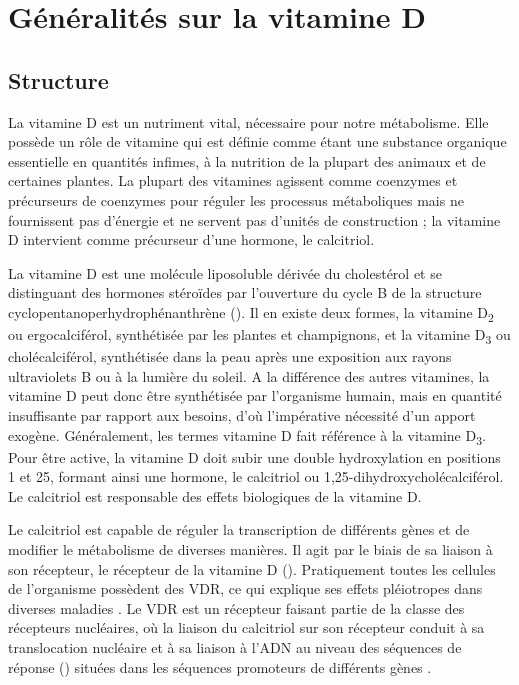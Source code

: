 \documentclass[
  a4paper,
  DIV=11,
  numbers=noendperiod,
  listof=totoc]{scrreprt}
\begin{document}
\newpage{}

\chapter{Généralités sur la vitamine
D}\label{guxe9nuxe9ralituxe9s-sur-la-vitamine-d}

\section{Structure}\label{structure}

La vitamine D est un nutriment vital, nécessaire pour notre métabolisme.
Elle possède un rôle de vitamine qui est définie comme étant une
substance organique essentielle en quantités infimes, à la nutrition de
la plupart des animaux et de certaines plantes. La plupart des vitamines
agissent comme coenzymes et précurseurs de coenzymes pour réguler les
processus métaboliques mais ne fournissent pas d'énergie et ne servent
pas d'unités de construction \autocite{Ellison.2021} ; la vitamine D
intervient comme précurseur d'une hormone, le calcitriol.

La vitamine D est une molécule liposoluble dérivée du cholestérol et se
distinguant des hormones stéroïdes par l'ouverture du cycle B de la
structure cyclopentanoperhydrophénanthrène \autocite{Norman.2008}
(). Il en existe deux formes, la vitamine
D\textsubscript{2} ou ergocalciférol, synthétisée par les plantes et
champignons, et la vitamine D\textsubscript{3} ou cholécalciférol,
synthétisée dans la peau après une exposition aux rayons ultraviolets B
ou à la lumière du soleil. A la différence des autres vitamines, la
vitamine D peut donc être synthétisée par l'organisme humain, mais en
quantité insuffisante par rapport aux besoins, d'où l'impérative
nécessité d'un apport exogène. Généralement, les termes vitamine D fait
référence à la vitamine D\textsubscript{3}. Pour être active, la
vitamine D doit subir une double hydroxylation en positions 1 et 25,
formant ainsi une hormone, le calcitriol ou
1,25-dihydroxycholécalciférol. Le calcitriol est responsable des effets
biologiques de la vitamine D.

Le calcitriol est capable de réguler la transcription de différents
gènes et de modifier le métabolisme de diverses manières. Il agit par le
biais de sa liaison à son récepteur, le récepteur de la vitamine D
(). Pratiquement toutes les cellules de l'organisme possèdent
des \ac{VDR}, ce qui explique ses effets pléiotropes dans diverses
maladies \autocite{Ellison.2021,Caprio.2017,Norman.2008}. Le \ac{VDR}
est un récepteur faisant partie de la classe des récepteurs nucléaires,
où la liaison du calcitriol sur son récepteur conduit à sa translocation
nucléaire et à sa liaison à l'ADN au niveau des séquences de réponse
() situées dans les séquences promoteurs de différents gènes
\autocite{Bouillon.2008}.
\end{document}
